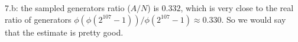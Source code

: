 \documentclass{article}
\begin{document}
\section{}

\pagebreak
\section{}


\pagebreak

7.b: the sampled generators ratio ($A / N$) is $0.332$, which is very close to the real ratio of generators $\phi(\phi(2^{107}-1)) / \phi(2^{107}-1) \approx 0.330$. So we would say that the estimate is pretty good.

\pagebreak
\section{}


\pagebreak

\end{document}
